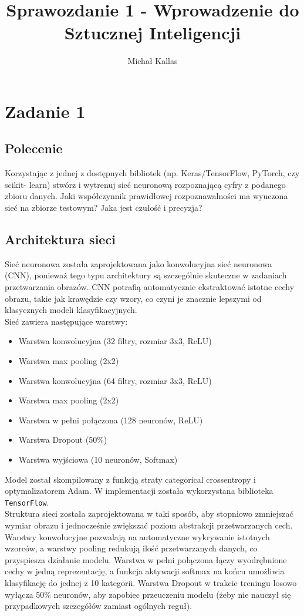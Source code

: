 \documentclass{article}
\title{Sprawozdanie 1 - Wprowadzenie do Sztucznej Inteligencji}
\author{Michał Kallas}
\begin{document}
\maketitle

\section{Zadanie 1}
\subsection{Polecenie}
Korzystając z jednej z dostępnych bibliotek (np. Keras/TensorFlow, PyTorch, czy scikit-
learn) stwórz i wytrenuj sieć neuronową rozpoznającą cyfry z podanego zbioru danych. Jaki
współczynnik prawidłowej rozpoznawalności ma wyuczona sieć na zbiorze testowym? Jaka
jest czułość i precyzja?

\subsection{Architektura sieci}
Sieć neuronowa została zaprojektowana jako konwolucyjna sieć neuronowa (CNN), ponieważ tego typu architektury są szczególnie skuteczne w zadaniach przetwarzania obrazów. CNN potrafią automatycznie ekstraktować istotne cechy obrazu, takie jak krawędzie czy wzory, co czyni je znacznie lepszymi od klasycznych modeli klasyfikacyjnych.\\

\noindent Sieć zawiera następujące warstwy:
\begin{itemize}
    \item Warstwa konwolucyjna (32 filtry, rozmiar 3x3, ReLU)
    \item Warstwa max pooling (2x2)
    \item Warstwa konwolucyjna (64 filtry, rozmiar 3x3, ReLU)
    \item Warstwa max pooling (2x2)
    \item Warstwa w pełni połączona (128 neuronów, ReLU)
    \item Warstwa Dropout (50\%)
    \item Warstwa wyjściowa (10 neuronów, Softmax)
\end{itemize}
Model został skompilowany z funkcją straty categorical crossentropy i optymalizatorem Adam. W implementacji została wykorzystana biblioteka \texttt{TensorFlow}.\\

Struktura sieci została zaprojektowana w taki sposób, aby stopniowo zmniejszać wymiar obrazu i jednocześnie zwiększać poziom abstrakcji przetwarzanych cech.
Warstwy konwolucyjne pozwalają na automatyczne wykrywanie istotnych wzorców, a warstwy pooling redukują ilość przetwarzanych danych, co przyspiesza działanie modelu.
Warstwa w pełni połączona łączy wyodrębnione cechy w jedną reprezentację, a funkcja aktywacji softmax na końcu umożliwia klasyfikację do jednej z 10 kategorii.
Warstwa Dropout w trakcie treningu losowo wyłącza 50\% neuronów, aby zapobiec przeuczeniu modelu (żeby nie nauczył się przypadkowych szczegółów zamiast ogólnych reguł).\\
\end{document}
